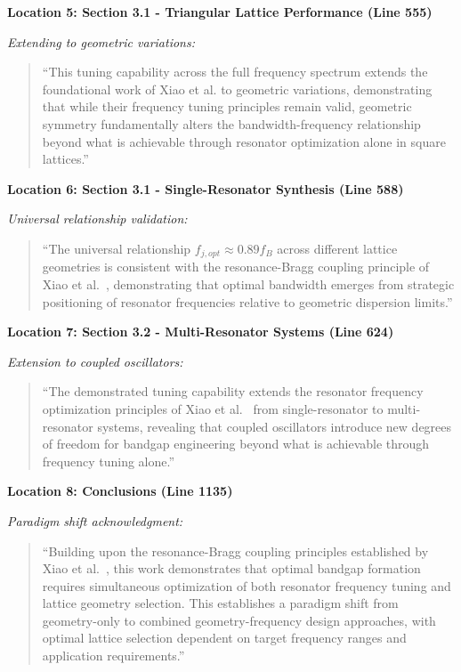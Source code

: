 \documentclass[11pt,a4paper]{article}
\newenvironment{changesbox}{%
    \par\medskip\noindent{\color{changescolor}\rule{\linewidth}{2pt}}\par
    \noindent{\color{changescolor}\bfseries Manuscript Changes}\par\smallskip
}{%
    \par\noindent{\color{changescolor}\rule{\linewidth}{0.5pt}}\medskip
}
\begin{document}
\begin{changesbox}
\textbf{Location 5: Section 3.1 - Triangular Lattice Performance (Line 555)}

\textit{Extending to geometric variations:}
\begin{quote}
\textcolor{redtext}{``This tuning capability across the full frequency spectrum extends the foundational work of Xiao et al. to geometric variations, demonstrating that while their frequency tuning principles remain valid, geometric symmetry fundamentally alters the bandwidth-frequency relationship beyond what is achievable through resonator optimization alone in square lattices.''}
\end{quote}

\textbf{Location 6: Section 3.1 - Single-Resonator Synthesis (Line 588)}

\textit{Universal relationship validation:}
\begin{quote}
\textcolor{redtext}{``The universal relationship $f_{j,opt} \approx 0.89 f_B$ across different lattice geometries is consistent with the resonance-Bragg coupling principle of Xiao et al.~\cite{Xiao2012}, demonstrating that optimal bandwidth emerges from strategic positioning of resonator frequencies relative to geometric dispersion limits.''}
\end{quote}

\textbf{Location 7: Section 3.2 - Multi-Resonator Systems (Line 624)}

\textit{Extension to coupled oscillators:}
\begin{quote}
\textcolor{redtext}{``The demonstrated tuning capability extends the resonator frequency optimization principles of Xiao et al.~\cite{Xiao2012} from single-resonator to multi-resonator systems, revealing that coupled oscillators introduce new degrees of freedom for bandgap engineering beyond what is achievable through frequency tuning alone.''}
\end{quote}

\textbf{Location 8: Conclusions (Line 1135)}

\textit{Paradigm shift acknowledgment:}
\begin{quote}
\textcolor{redtext}{``Building upon the resonance-Bragg coupling principles established by Xiao et al.~\cite{Xiao2012}, this work demonstrates that optimal bandgap formation requires simultaneous optimization of both resonator frequency tuning and lattice geometry selection. This establishes a paradigm shift from geometry-only to combined geometry-frequency design approaches, with optimal lattice selection dependent on target frequency ranges and application requirements.''}
\end{quote}
\end{changesbox}
\end{document}
